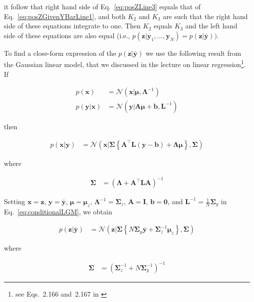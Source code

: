 \documentclass[12pt]{article}
\begin{document}
\noindent it
follow that right hand side of Eq.~\ref{eq:posZLine3} equals that of
Eq.~\ref{eq:posZGivenYBarLine1}, and both $K_2$ and $K_3$ are such that the
right hand side of these equations integrate to one. Then $K_2$ equals
$K_3$ and the left hand side of these equations are also equal (i.e.,
$p(\mathbf{z}|\mathbf{y}_1,\ldots,\mathbf{y}_N)=p(\mathbf{z}|\bar{\mathbf{y}}))$.

To find a close-form expression of the $p(\mathbf{z}|\bar{\mathbf{y}})$ we use
the following result from the Gaussian linear model, that we discussed in the
lecture on linear regression\footnote{see Eqs.~2.166 and~2.167 in
\citet{bishop06}}.
%
If

\begin{align*}
    p(\mathbf{x})&=\mathcal{N}(\mathbf{x}|\boldsymbol{\mu},\boldsymbol{\Lambda}^{-1})\\
    p(\mathbf{y}|\mathbf{x})&=\mathcal{N}(\mathbf{y}|\mathbf{A}\boldsymbol{\mu}+\mathbf{b},\mathbf{L}^{-1})
\end{align*}

\noindent then

\begin{align}
    p(\mathbf{x}|\mathbf{y})&=\mathcal{N}(\mathbf{x}|\boldsymbol{\Sigma}\left\{\mathbf{A}^\intercal\mathbf{L}(\mathbf{y}-\mathbf{b})+\boldsymbol{\Lambda}\boldsymbol{\mu}\right\},\boldsymbol{\Sigma})\label{eq:conditionalLGM}
\end{align}

\noindent where

\begin{align*}
    \boldsymbol{\Sigma}&=(\boldsymbol{\Lambda}+\mathbf{A}^\intercal\mathbf{L}\mathbf{A})^{-1}
\end{align*}

Setting $\mathbf{x}=\mathbf{z}$, $\mathbf{y}=\bar{\mathbf{y}}$, $\boldsymbol{\mu}=\boldsymbol{\mu}_z$,
$\boldsymbol{\Lambda}^{-1}=\boldsymbol{\Sigma}_z$, $\mathbf{A}=\mathbf{I}$,
$\mathbf{b}=\mathbf{0}$, and $\mathbf{L}^{-1}=\frac{1}{N}\boldsymbol{\Sigma}_y$
in Eq.~\ref{eq:conditionalLGM}, we obtain

\begin{align*}
    p(\mathbf{z}|\bar{\mathbf{y}})&=\mathcal{N}(\mathbf{z}|\boldsymbol{\Sigma}\left\{N\boldsymbol{\Sigma}_y\bar{\mathbf{y}}+\boldsymbol{\Sigma}_z^{-1}\boldsymbol{\mu}_z\right\},\boldsymbol{\Sigma})
\end{align*}

\noindent where

\begin{align*}
    \boldsymbol{\Sigma}&=(\boldsymbol{\Sigma}_z^{-1}+N\mathbf{\Sigma}_y^{-1})^{-1}
\end{align*}
\end{document}
